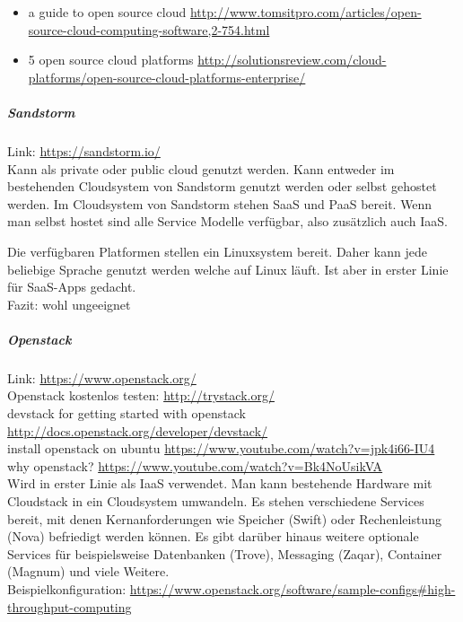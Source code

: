 \documentclass[a4paper,10pt]{article}
\begin{document}
\begin{itemize}
 \item a guide to open source cloud \url{http://www.tomsitpro.com/articles/open-source-cloud-computing-software,2-754.html}
 \item 5 open source cloud platforms \url{http://solutionsreview.com/cloud-platforms/open-source-cloud-platforms-enterprise/}
\end{itemize}

\subparagraph{Sandstorm}

Link: \url{https://sandstorm.io/}\\

Kann als private oder public cloud genutzt werden.
Kann entweder im bestehenden Cloudsystem von Sandstorm genutzt werden oder selbst gehostet werden.
Im Cloudsystem von Sandstorm stehen SaaS und PaaS bereit.
Wenn man selbst hostet sind alle Service Modelle verfügbar, also zusätzlich auch IaaS.

Die verfügbaren Platformen stellen ein Linuxsystem bereit.
Daher kann jede beliebige Sprache genutzt werden welche auf Linux läuft.
Ist aber in erster Linie für SaaS-Apps gedacht.\\

Fazit:
wohl ungeeignet

\subparagraph{Openstack}

Link: \url{https://www.openstack.org/}\\
Openstack kostenlos testen: \url{http://trystack.org/}\\
devstack for getting started with openstack \url{http://docs.openstack.org/developer/devstack/}\\
install openstack on ubuntu \url{https://www.youtube.com/watch?v=jpk4i66-IU4}\\

why openstack? \url{https://www.youtube.com/watch?v=Bk4NoUsikVA}\\

Wird in erster Linie als IaaS verwendet.
Man kann bestehende Hardware mit Cloudstack in ein Cloudsystem umwandeln.
Es stehen verschiedene Services bereit, mit denen Kernanforderungen wie Speicher (Swift) oder Rechenleistung (Nova) befriedigt werden können.
Es gibt darüber hinaus weitere optionale Services für beispielsweise Datenbanken (Trove), Messaging (Zaqar), Container (Magnum) und viele Weitere.\\

Beispielkonfiguration: \url{https://www.openstack.org/software/sample-configs#high-throughput-computing}
\end{document}
